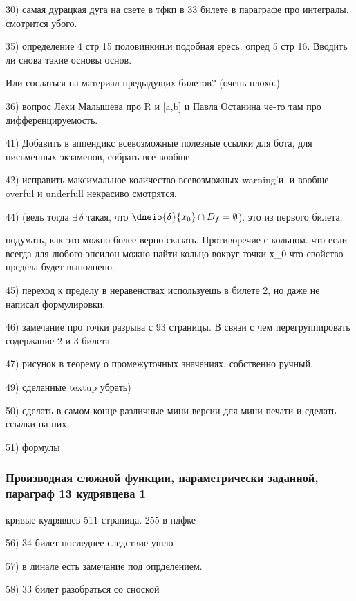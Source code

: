 30) самая дурацкая дуга на свете в тфкп в 33 билете в параграфе про интегралы. смотрится убого.

35) определение 4 стр 15 половинкин.и подобная ересь.
опред 5 стр 16. Вводить ли снова такие основы основ. 

Или сослаться на материал предыдущих билетов? (очень плохо.)

36) вопрос Лехи Малышева про R и [a,b] и Павла Останина че-то там про дифференцируемость.

41) Добавить в аппендикс всевозможные полезные ссылки для бота, для письменных экзаменов, собрать все вообще.

42) исправить максимальное количество всевозможных warning'и. и вообще overful и underfull некрасиво смотрятся.

44) (ведь тогда $\exists\, \delta$ такая, что $\dneio{\delta}{x_0}\cap D_f=\emptyset$). это из первого билета.

подумать, как это можно более верно сказать. Противоречие с кольцом. что если всегда для любого эпсилон можно найти кольцо вокруг точки х_0 что свойство предела будет выполнено.

45) переход к пределу в неравенствах используешь в билете 2, но даже не написал формулировки.

46) замечание про точки разрыва с 93 страницы. В связи с чем перегруппировать содержание 2 и 3 билета.

47) рисунок в теорему о промежуточных значениях. собственно ручный.

49) сделанные textup убрать)

50) сделать в самом конце различные мини-версии для мини-печати и сделать ссылки на них.

51) формулы
\subsubsection{Производная сложной функции, параметрически заданной, параграф 13 кудрявцева 1}

кривые кудрявцев 511 страница. 255 в пдфке

56) 34 билет последнее следствие ушло

57) в линале есть замечание под опрделением.

58) 33 билет разобраться со сноской

